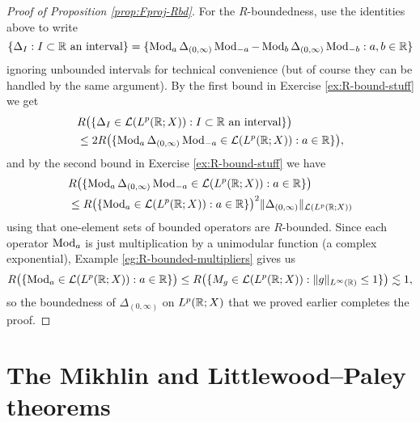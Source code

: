 \begin{proof}[Proof of Proposition \ref{prop:Fproj-Rbd}]
  For the $R$-boundedness, use the identities above to write
  \begin{equation*}
    \{\Delta_{I} : \text{$I \subset \mathbb{R}$ an interval}\}
    = \{\operatorname{Mod}_{a} \Delta_{(0,\infty)} \operatorname{Mod}_{-a} - \operatorname{Mod}_{b} \Delta_{(0,\infty)} \operatorname{Mod}_{-b} : a,b \in \mathbb{R}\} 
  \end{equation*}
  ignoring unbounded intervals for technical convenience (but of course they can be handled by the same argument).
  By the first bound in Exercise \ref{ex:R-bound-stuff} we get
  \begin{equation*}
    \begin{aligned}
      &R\big( \{\Delta_{I} \in \mathcal{L}(L^p(\mathbb{R};X)) : \text{$I \subset \mathbb{R}$ an interval}\} \big) \\
      &\leq 2R\big( \{\operatorname{Mod}_{a} \Delta_{(0,\infty)} \operatorname{Mod}_{-a} \in \mathcal{L}(L^p(\mathbb{R};X)) : a \in \mathbb{R}\}  \big),
  \end{aligned}
  \end{equation*}
  and by the second bound in Exercise \ref{ex:R-bound-stuff} we have
  \begin{equation*}
    \begin{aligned}
      &R\big( \{\operatorname{Mod}_{a} \Delta_{(0,\infty)} \operatorname{Mod}_{-a} \in \mathcal{L}(L^p(\mathbb{R};X)) : a \in \mathbb{R}\}  \big) \\
      &\leq R\big( \{ \operatorname{Mod}_{a} \in \mathcal{L}(L^p(\mathbb{R};X)) : a \in \mathbb{R} \} \big)^{2} \|\Delta_{(0,\infty)}\|_{\mathcal{L}(L^p(\mathbb{R};X))}
    \end{aligned}
  \end{equation*}
  using that one-element sets of bounded operators are $R$-bounded.
  Since each operator $\operatorname{Mod}_{a}$ is just multiplication by a unimodular function (a complex exponential), Example \ref{eg:R-bounded-multipliers} gives us
  \begin{equation*}
    R\big( \{ \operatorname{Mod}_{a} \in \mathcal{L}(L^p(\mathbb{R};X)) : a \in \mathbb{R} \} \big)
    \leq R\big( \{ M_{g} \in \mathcal{L}(L^p(\mathbb{R};X))  : \|g\|_{L^\infty(\mathbb{R})} \leq 1\} \big) \lesssim 1,
\end{equation*}
so the boundedness of $\Delta_{(0,\infty)}$ on $L^p(\mathbb{R};X)$ that we proved earlier completes the proof.
\end{proof}


\section{The Mikhlin and Littlewood--Paley theorems}

